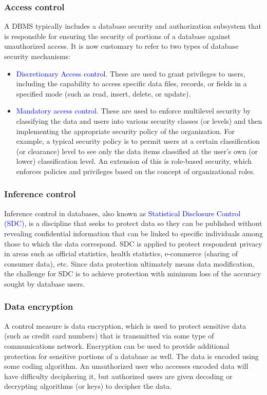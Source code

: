 \documentclass[a4paper]{article}
\numberwithin{equation}{section}
\begin{document}
\subsubsection{Access control}
A DBMS typically includes a database security and authorization subsystem that is responsible for ensuring the security of portions of a database against unauthorized access. It is now customary to refer to two types of database security mechanisms:
\begin{itemize}
    \item \textcolor{blue}{Discretionary Access control}. These are used to grant privileges to users, including the capability to access specific data files, records, or fields in a specified mode (such as read, insert, delete, or update).
    \item \textcolor{blue}{Mandatory access control}. These are used to enforce multilevel security by classifying the data and users into various security classes (or levels) and then implementing the appropriate security policy of the organization. For example, a typical security policy is to permit users at a certain classification (or clearance) level to see only the data items classified at the user’s own (or lower) classification level. An extension of this is role-based security, which enforces policies and privileges based on the concept of organizational roles.
\end{itemize}

\subsubsection{Inference control}
Inference control in databases, also known as \textcolor{blue}{Statistical Disclosure Control (SDC)}, is a discipline that seeks to protect data so they can be published without revealing confidential information that can be linked to specific individuals among those to which the data correspond. SDC is applied to protect respondent privacy in areas such as official statistics, health statistics, e-commerce (sharing of consumer data), etc. Since data protection ultimately means data modification, the challenge for SDC is to achieve protection with minimum loss of the accuracy sought by database users.

\subsubsection{Data encryption}
A control measure is data encryption, which is used to protect sensitive data (such as credit card numbers) that is transmitted via some type of communications network. Encryption can be used to provide additional protection for sensitive portions of a database as well. The data is encoded using some coding algorithm. An unauthorized user who accesses encoded data will have difficulty deciphering it, but authorized users are given decoding or decrypting algorithms (or keys) to decipher the data.
\end{document}

